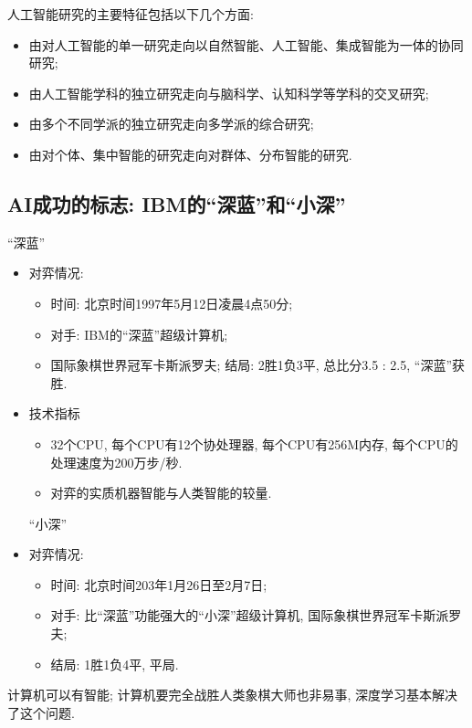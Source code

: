 人工智能研究的主要特征包括以下几个方面:
\begin{itemize}
\item 由对人工智能的单一研究走向以自然智能、人工智能、集成智能为一体的协同研究;
\item 由人工智能学科的独立研究走向与脑科学、认知科学等学科的交叉研究;
\item 由多个不同学派的独立研究走向多学派的综合研究;
\item 由对个体、集中智能的研究走向对群体、分布智能的研究.
\end{itemize}

\subsection{AI成功的标志: IBM的“深蓝”和“小深”}
\textcolor[rgb]{0, 0, 1}{“深蓝”}
\begin{itemize}
\item 对弈情况:
     \begin{itemize}
         \item 时间: 北京时间1997年5月12日凌晨4点50分;
         \item 对手: IBM的“深蓝”超级计算机;
         \item 国际象棋世界冠军卡斯派罗夫;
               结局: 2胜1负3平, 总比分3.5 : 2.5,  “深蓝”获胜.
     \end{itemize}
\item 技术指标
     \begin{itemize}
         \item 32个CPU, 每个CPU有12个协处理器, 每个CPU有256M内存, 每个CPU的处理速度为200万步/秒.
         \item 对弈的实质机器智能与人类智能的较量.
     \end{itemize}
\textcolor[rgb]{0, 0, 1}{“小深”}
\item 对弈情况:
     \begin{itemize}
         \item 时间: 北京时间203年1月26日至2月7日;
         \item 对手: 比“深蓝”功能强大的“小深”超级计算机, 国际象棋世界冠军卡斯派罗夫;
         \item 结局: 1胜1负4平, 平局.
     \end{itemize}
\end{itemize}
\begin{remark}
  计算机可以有智能; 计算机要完全战胜人类象棋大师也非易事, 深度学习基本解决了这个问题.
\end{remark}
